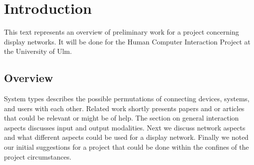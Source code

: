 \section{Introduction}

This text represents an overview of preliminary work for a project concerning display networks.
It will be done for the Human Computer Interaction Project at the University of Ulm.

\subsection{Overview}

System types describes the possible permutations of connecting devices, systems, and users with each other.
Related work shortly presents papers and or articles that could be relevant or might be of help.
The section on general interaction aspects discusses input and output modalities.
Next we discuss network aspects and what different aspects could be used for a display network.
Finally we noted our initial suggestions for a project that could be done within the confines of the project circumstances.